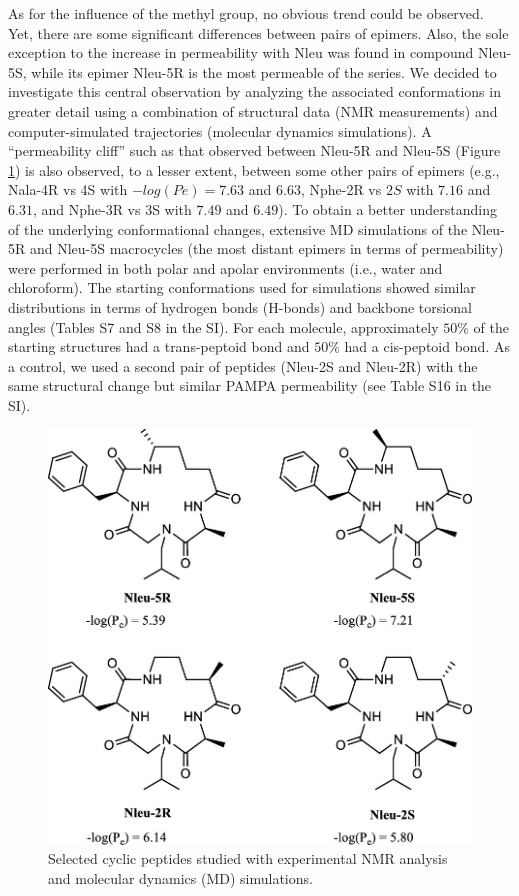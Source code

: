 As for the influence of the methyl group, no obvious trend could be observed. Yet, there are some significant differences between pairs of epimers. Also, the sole exception to the increase in permeability with Nleu was found in compound Nleu-5S, while its epimer Nleu-5R is the most permeable of the series. We decided to investigate this central observation by analyzing the associated conformations in greater detail using a combination of structural data (NMR measurements) and computer-simulated trajectories (molecular dynamics simulations).
A “permeability cliff” such as that observed between Nleu-5R and Nleu-5S (Figure \ref{fig: macrocycles}) is also observed, to a lesser extent, between some other pairs of epimers (e.g., Nala-4R vs 4S with $−log(Pe) = 7.63$ and $6.63$, Nphe-2R vs $2S$ with $7.16$ and $6.31$, and Nphe-3R vs 3S with $7.49$ and $6.49$). To obtain a better understanding of the underlying conformational changes, extensive MD simulations of the Nleu-5R and Nleu-5S macrocycles (the most distant epimers in terms of permeability) were performed in both polar and apolar environments (i.e., water and chloroform). 
The starting conformations used for simulations showed similar distributions in terms of hydrogen bonds (H-bonds) and backbone torsional angles (Tables S7 and S8 in the SI). 
For each molecule, approximately $50\%$ of the starting structures had a trans-peptoid bond and $50\%$ had a cis-peptoid bond. As a control, we used a second pair of peptides (Nleu-2S and Nleu-2R) with the same structural change but similar PAMPA permeability (see Table S16 in the SI).

\begin{figure}
    \centering
    \includegraphics[width=\textwidth]{7_chapter_5/fig/results/macrocycles.jpeg}
    \caption{Selected cyclic peptides studied with experimental NMR analysis and molecular dynamics (MD) simulations.}
    \label{fig: macrocycles}
\end{figure}

